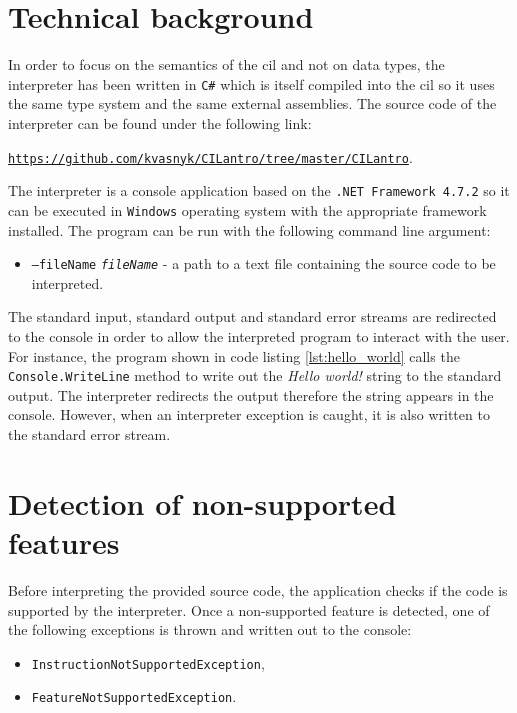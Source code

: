 \documentclass[declaration,shortabstract,english,mgr]{iithesis}
\begin{document}
\section{Technical background}

In order to focus on the semantics of the \acrshort{cil} and not on data types, the interpreter has been written in \texttt{C\#} which is itself compiled into the \acrshort{cil} so it uses the same type system and the same external assemblies. The source code of the interpreter can be found under the following link:

\begin{center}
	\href{https://github.com/kvasnyk/CILantro/tree/master/CILantro}{\texttt{https://github.com/kvasnyk/CILantro/tree/master/CILantro}}.
\end{center}

The interpreter is a console application based on the \texttt{.NET Framework 4.7.2} so it can be executed in \texttt{Windows} operating system with the appropriate framework installed. The program can be run with the following command line argument:
\begin{itemize}
	\item{\texttt{--fileName} \texttt{\textit{fileName}} - a path to a text file containing the source code to be interpreted.}
\end{itemize}

The standard input, standard output and standard error streams are redirected to the console in order to allow the interpreted program to interact with the user. For instance, the program shown in code listing \ref{lst:hello_world} calls the \texttt{Console.WriteLine} method to write out the \textit{Hello world!} string to the standard output. The interpreter redirects the output therefore the string appears in the console. However, when an interpreter exception is caught, it is also written to the standard error stream.

\section{Detection of non-supported features}

Before interpreting the provided source code, the application checks if the code is supported by the interpreter. Once a non-supported feature is detected, one of the following exceptions is thrown and written out to the console:
\begin{itemize}
	\item{\texttt{InstructionNotSupportedException},}
	\item{\texttt{FeatureNotSupportedException}.}
\end{itemize}
\end{document}
